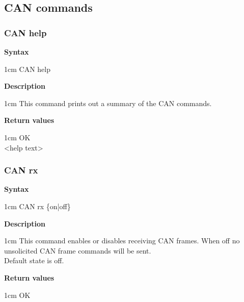\documentclass{article}[a4paper]
\begin{document}
\subsection{CAN commands}
\subsubsection{CAN help}
\begin{tcolorbox}
	{\bf Syntax}

	 1cm \dimexpr\linewidth-2cm\relax
	CAN help

	\medskip
	{\bf Description}

	 1cm \dimexpr\linewidth-2cm\relax
	This command prints out a summary of the CAN commands.

	\medskip
	{\bf Return values}

	 1cm \dimexpr\linewidth-2cm\relax
	OK \\
	<help text>
\end{tcolorbox}

\subsubsection{CAN rx}
\begin{tcolorbox}
	{\bf Syntax}

	 1cm \dimexpr\linewidth-2cm\relax
	CAN rx \{on|off\}

	\medskip
	{\bf Description}

	 1cm \dimexpr\linewidth-2cm\relax
	This command enables or disables receiving CAN frames. When off no unsolicited
	CAN frame commands will be sent. \\
	Default state is off.

	\medskip
	{\bf Return values}

	 1cm \dimexpr\linewidth-2cm\relax
	OK
\end{tcolorbox}
\end{document}
